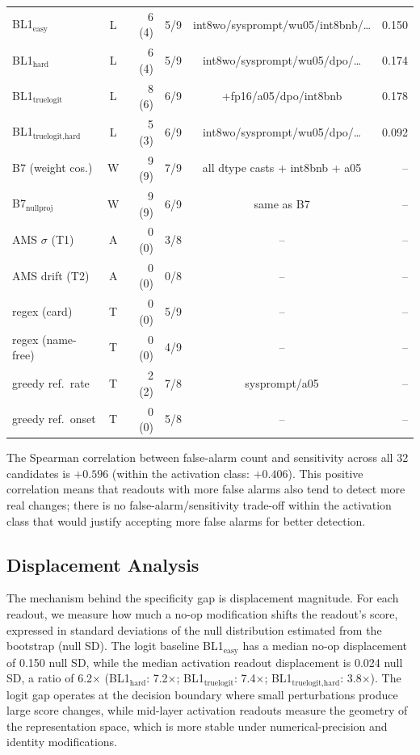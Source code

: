 \documentclass[11pt,letterpaper]{article}
\begin{document}
\begin{table}[!htbp]
\begin{tabular}{lcrrcr}
\midrule
BL1$_\text{easy}$  & L & 6 (4) & 5/9 & int8wo/sysprompt/wu05/int8bnb/\ldots & 0.150 \\
BL1$_\text{hard}$  & L & 6 (4) & 5/9 & int8wo/sysprompt/wu05/dpo/\ldots & 0.174 \\
BL1$_\text{truelogit}$ & L & 8 (6) & 6/9 & +fp16/a05/dpo/int8bnb & 0.178 \\
BL1$_\text{truelogit,hard}$ & L & 5 (3) & 6/9 & int8wo/sysprompt/wu05/dpo/\ldots & 0.092 \\
\midrule
B7 (weight cos.)       & W & 9 (9) & 7/9 & all dtype casts + int8bnb + a05 & -- \\
B7$_\text{nullproj}$   & W & 9 (9) & 6/9 & same as B7 & -- \\
\midrule
AMS $\sigma$ (T1)  & A & 0 (0) & 3/8 & -- & -- \\
AMS drift (T2)     & A & 0 (0) & 0/8 & -- & -- \\
regex (card)       & T & 0 (0) & 5/9 & -- & -- \\
regex (name-free)  & T & 0 (0) & 4/9 & -- & -- \\
greedy ref.\ rate  & T & 2 (2) & 7/8 & sysprompt/a05 & -- \\
greedy ref.\ onset & T & 0 (0) & 5/8 & -- & -- \\
\bottomrule
\end{tabular}
\end{table}

The Spearman correlation between false-alarm count and sensitivity across all 32 candidates is $+0.596$ (within the activation class: $+0.406$). This positive correlation means that readouts with more false alarms also tend to detect more real changes; there is no false-alarm/sensitivity trade-off within the activation class that would justify accepting more false alarms for better detection.


\subsection{Displacement Analysis}
\label{sec:results-displacement}

The mechanism behind the specificity gap is displacement magnitude. For each readout, we measure how much a no-op modification shifts the readout's score, expressed in standard deviations of the null distribution estimated from the bootstrap (null SD). The logit baseline BL1$_\text{easy}$ has a median no-op displacement of 0.150 null SD, while the median activation readout displacement is 0.024 null SD, a ratio of 6.2$\times$ (BL1$_\text{hard}$: 7.2$\times$; BL1$_\text{truelogit}$: 7.4$\times$; BL1$_\text{truelogit,hard}$: 3.8$\times$). The logit gap operates at the decision boundary where small perturbations produce large score changes, while mid-layer activation readouts measure the geometry of the representation space, which is more stable under numerical-precision and identity modifications.
\end{document}
